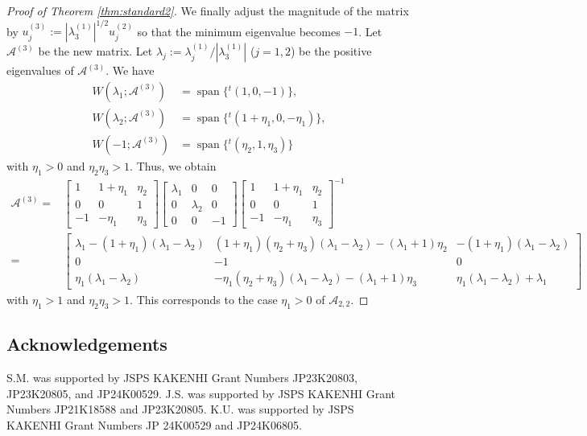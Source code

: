 \documentclass[11pt,a4paper,twosides]{amsart}
\theoremstyle{plain}
\theoremstyle{remark}
\numberwithin{equation}{section}
\DeclareMathOperator{\Span}{span}
\theoremstyle{definition}
\newcommand{\1}{{\bf 1}_{\{|x| < |t|\}}}
\begin{document}
\begin{proof}[Proof of Theorem \ref{thm:standard2}]
We finally adjust the magnitude of the matrix by $u_j^{(3)} := |\lambda_3^{(1)}|^{1/2}u_j^{(2)}$ so that the minimum eigenvalue becomes $-1$.
Let $\mathscr{A}^{(3)}$ be the new matrix. Let $\lambda_j:=\lambda_j^{(1)}/|\lambda_3^{(1)}|$ ($j=1,2$) be the positive eigenvalues of $\mathscr{A}^{(3)}$. We have
\begin{align*}
	W(\lambda_1;\mathscr{A}^{(3)})
	&= \Span\{{}^t\!(1,0,-1)\}, \\
	W(\lambda_2;\mathscr{A}^{(3)})
	&= \Span\{{}^t\!(1+\eta_1,0,-\eta_1)\}, \\
	W(-1;\mathscr{A}^{(3)})&=\Span\{{}^t\!(\eta_2,1,\eta_3)\}
\end{align*}
with $\eta_1>0$ and $\eta_2\eta_3>1$.
Thus, we obtain
\begin{align*}
	\mathscr{A}^{(3)}
	={}& \begin{bmatrix}
	1 & 1+\eta_1 & \eta_2 \\
	0 & 0& 1\\
	-1 & -\eta_1& \eta_3
	\end{bmatrix}
	\begin{bmatrix}
	\lambda_1 & 0 & 0 \\
	0 & \lambda_2 & 0\\
	0 & 0 & -1
	\end{bmatrix}
	\begin{bmatrix}
	1 & 1+\eta_1 & \eta_2 \\
	0 & 0& 1\\
	-1 & -\eta_1& \eta_3
	\end{bmatrix}^{-1} \\
	={}& \begin{bmatrix}
	\lambda_1-(1+\eta_1)(\lambda_1-\lambda_2) & 
	(1+\eta_1)(\eta_2+\eta_3)(\lambda_1-\lambda_2) -(\lambda_1+1)\eta_2
	& -(1+\eta_1)(\lambda_1-\lambda_2) \\
	0 & -1& 0\\
	\eta_1(\lambda_1-\lambda_2) & -\eta_1(\eta_2+\eta_3)(\lambda_1-\lambda_2) -(\lambda_1+1)\eta_3  & \eta_1(\lambda_1-\lambda_2)
	+\lambda_1
	\end{bmatrix}
\end{align*}
with $\eta_1>1$ and $\eta_2\eta_3>1$.
This corresponds to the case $\eta_1>0$ of $\mathscr{A}_{2,2}$.
\end{proof}

\subsection*{Acknowledgements} 
S.M. was  supported by JSPS KAKENHI Grant Numbers 
JP23K20803, JP23K20805, and JP24K00529.
J.S. was supported by JSPS KAKENHI Grant Numbers 
JP21K18588 and JP23K20805.  
K.U. was  supported by JSPS KAKENHI Grant Numbers 
JP 24K00529 and JP24K06805.
\end{document}
